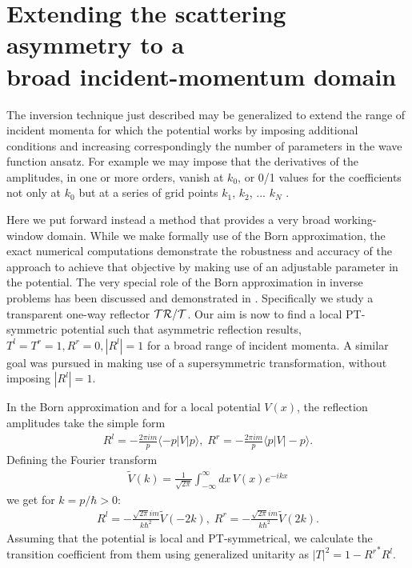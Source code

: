 %

%

\section{Extending the scattering asymmetry to a \\broad incident-momentum domain\label{sec:chapter1_extension}}
%
%
%
%
The inversion technique just described may be generalized
to extend the range of incident momenta for which the potential works by imposing additional
conditions and increasing correspondingly the number of parameters in the wave function ansatz. For example we may impose that the derivatives of the  amplitudes,  in one or more orders,  vanish at $k_0$,
or  0/1 values for the coefficients not only at  $k_0$ but at a series of grid points $k_1$, $k_2$, ... $k_N$ \cite{Brouard1994,Palao1998a,Palao1998,Muga2004}.

Here we put forward instead a method that provides a very broad working-window domain.
While we make formally use of the Born approximation, the exact numerical
computations demonstrate the robustness and accuracy of the approach to achieve that objective by
making use of an adjustable parameter in the potential. The very special role of the Born approximation in inverse problems has been
discussed and demonstrated in \cite{Snieder1990,Mostafazadeh2014,Horsley2015}.
Specifically we study a transparent one-way reflector ${\cal{TR/T}}$.
Our aim is now to find a local PT-symmetric potential such that asymmetric reflection results,
$T^l = T^r = 1, R^r = 0, |R^l|=1$ for a broad range of incident momenta. A similar goal
was pursued in \cite{Longhi2014} making use of a supersymmetric transformation,
without imposing $|R^l|=1$.

In the Born approximation and for a local potential $V(x)$, the reflection amplitudes take the simple form
%
\begin{eqnarray}
  R^l=-\frac{2\pi i m}{p}\langle -p|V|p\rangle,
  \;
  R^r=-\frac{2\pi i m}{p}\langle p|V|-p\rangle.
\end{eqnarray}
%
Defining the Fourier transform
%
\begin{eqnarray}
  \widetilde V (k) = \frac{1}{\sqrt{2\pi}} \int_{-\infty}^\infty dx \, V(x) e^{-i k x}
\end{eqnarray}
%
we get for $k=p/\hbar>0$:
%
\begin{eqnarray}
  R^l=-\frac{\sqrt{2\pi} i m}{k \hbar^2} \widetilde V (-2k),
  \;
  R^r=-\frac{\sqrt{2\pi} i m}{k\hbar^2} \widetilde V (2 k).
\end{eqnarray}
%
Assuming that the potential is local and PT-symmetrical, we calculate the transition coefficient
from them using generalized unitarity as
$|T|^2=1-{R^r}^*R^l$.

